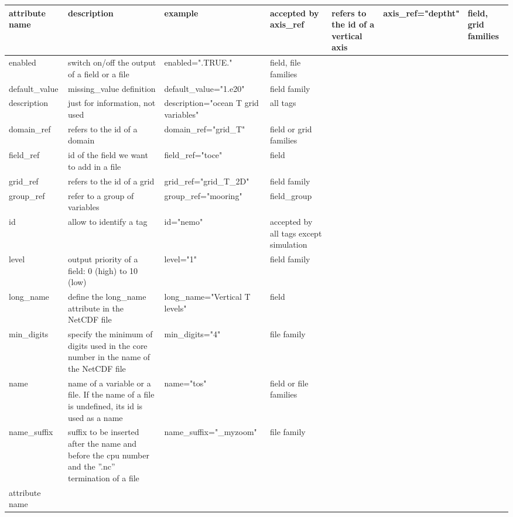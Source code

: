 \begin{longtable}{|p{2.2cm}|p{4cm}|p{3.8cm}|p{2cm}|}
   \hline
   attribute name & 
   description & 
   example & 
   accepted by \endhead
   \hline   
   axis\_ref & 
   refers to the id of a vertical axis & 
   axis\_ref="deptht" & 
   field, grid families \\ 
   \hline   
   enabled & 
   switch on/off the output of a field or a file & 
   enabled=".TRUE." & 
   field, file families \\ 
   \hline   
   default\_value & 
   missing\_value definition & 
   default\_value="1.e20" & 
   field family \\ 
   \hline   
   description & 
   just for information, not used & 
   description="ocean T grid variables" & 
   all tags \\ 
   \hline   
   domain\_ref & 
   refers to the id of a domain & 
   domain\_ref="grid\_T" & 
   field or grid families \\ 
   \hline   
   field\_ref & 
   id of the field we want to add in a file & 
   field\_ref="toce" & 
   field \\ 
   \hline   
   grid\_ref & 
   refers to the id of a grid & 
   grid\_ref="grid\_T\_2D" & 
   field family \\ 
   \hline   
   group\_ref & 
   refer to a group of variables & 
   group\_ref="mooring" & 
   field\_group \\ 
   \hline   
   id & 
   allow to identify a tag & 
   id="nemo" &
   accepted by all tags except simulation \\ 
   \hline   
   level & 
   output priority of a field: 0 (high) to 10 (low)& 
   level="1" & 
   field family \\ 
   \hline   
   long\_name & 
   define the long\_name attribute in the NetCDF file & 
   long\_name="Vertical T levels" & 
   field \\ 
   \hline   
   min\_digits & 
   specify the minimum of digits used in the core number in the name of the NetCDF file & 
   min\_digits="4" & 
   file family \\ 
   \hline   
   name & 
   name of a variable or a file. If the name of a file is undefined, its id is used as a name & 
   name="tos" & 
   field or file families \\ 
   \hline   
   name\_suffix & 
   suffix to be inserted after the name and before the cpu number and the ''.nc'' termination of a file & 
   name\_suffix="\_myzoom" & 
   file family \\ 
   \hline   
   attribute name & 

\end{longtable}
